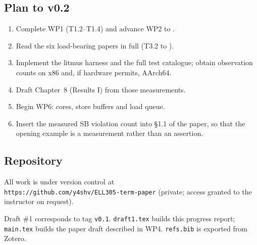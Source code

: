 \subsection{Plan to v0.2}

\begin{enumerate}[leftmargin=*,itemsep=2pt]
\item Complete WP1 (T1.2--T1.4) and advance WP2 to .
\item Read the six load-bearing papers in full (T3.2 to ).
\item Implement the litmus harness and the full test catalogue; obtain
  observation counts on x86 and, if hardware permits, AArch64.
\item Draft Chapter~8 (Results I) from those measurements.
\item Begin WP6: cores, store buffers and load queue.
\item Insert the measured SB violation count into \S1.1 of the paper, so that
  the opening example is a measurement rather than an assertion.
\end{enumerate}

\subsection{Repository}

All work is under version control at\\
\texttt{https://github.com/y4shv/ELL305-term-paper} (private; access granted to
the instructor on request).

\medskip
\noindent Draft \#1 corresponds to tag \texttt{v0.1}.
\texttt{draft1.tex} builds this progress report; \texttt{main.tex} builds the
paper draft described in WP4.
\texttt{refs.bib} is exported from Zotero.
